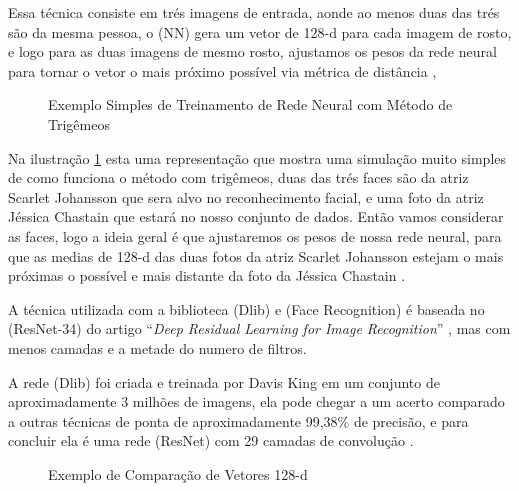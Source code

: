  Essa técnica consiste em trés imagens de entrada, aonde ao menos duas das trés são da mesma pessoa, o (NN) gera um vetor de 128-d para cada imagem de rosto, e logo para as duas imagens de mesmo rosto, ajustamos os pesos da rede neural para tornar o vetor o mais próximo possível via métrica de distância \cite{adriamRF},

\begin{figure}[H]
	\centering
	\caption{Exemplo Simples de Treinamento de Rede Neural com Método de Trigêmeos}
	\fontsize{9pt}{12pt}\selectfont
	\color{black}
	\def\svgwidth{15cm}
	
	\label{fig:treinsimp}
\end{figure}


Na ilustração \ref{fig:treinsimp} esta uma representação que mostra uma simulação muito simples de como funciona o método com trigêmeos, duas das trés faces são da atriz Scarlet Johansson que sera alvo no reconhecimento facial, e uma foto da atriz Jéssica Chastain que estará no nosso conjunto de dados. Então vamos considerar as faces, logo a ideia geral é que ajustaremos os pesos de nossa rede neural, para que as medias de 128-d das duas fotos da atriz Scarlet Johansson estejam o mais próximas o possível e mais distante da foto da Jéssica Chastain \cite{adamgeitgey}.

A técnica utilizada com a biblioteca (Dlib) e (Face Recognition) é baseada no (ResNet-34) do artigo “\textit{Deep Residual Learning for Image Recognition}” \cite{DBLP:journals/corr/HeZRS15}, mas com menos camadas e a metade do numero de filtros. 

A rede (Dlib) foi criada e treinada por Davis King em um conjunto de aproximadamente 3 milhões de imagens, ela pode chegar a um acerto comparado a outras técnicas de ponta de aproximadamente 99,38\% de precisão, e para concluir ela é uma rede (ResNet) com 29 camadas de convolução \cite{dlib1}.
\begin{figure}[H]
	\centering
	\caption{Exemplo de Comparação de Vetores 128-d}
	\fontsize{9pt}{12pt}\selectfont
	\def\svgwidth{13cm}
	
	\label{fig:exetrein}
\end{figure}


